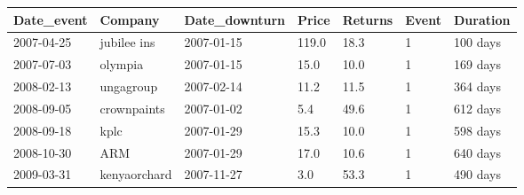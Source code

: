 \documentclass{article}
\begin{document}
\begin{table}[h!]
\centering
\begin{tabular}{l l l l l l l}
\hline
Date\_event & Company & Date\_downturn & Price & Returns & Event & Duration \\
\hline
2007-04-25 & jubilee ins & 2007-01-15 & 119.0 & 18.3 & 1 & 100 days \\
2007-07-03 & olympia & 2007-01-15 & 15.0 & 10.0 & 1 & 169 days \\
2008-02-13 & ungagroup & 2007-02-14 & 11.2 & 11.5 & 1 & 364 days \\
2008-09-05 & crownpaints & 2007-01-02 & 5.4 & 49.6 & 1 & 612 days \\
2008-09-18 & kplc & 2007-01-29 & 15.3 & 10.0 & 1 & 598 days \\
2008-10-30 & ARM & 2007-01-29 & 17.0 & 10.6 & 1 & 640 days \\
2009-03-31 & kenyaorchard & 2007-11-27 & 3.0 & 53.3 & 1 & 490 days \\
\hline
\end{tabular}

\end{table}
\end{document}
